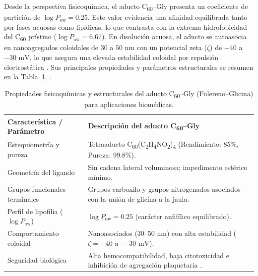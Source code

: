 Desde la perspectiva fisicoquímica, el aducto C\textsubscript{60}--Gly presenta un coeficiente de partición de $\log P_{\text{ow}} = 0.25$. Este valor evidencia una afinidad equilibrada tanto por fases acuosas como lipídicas, lo que contrasta con la extrema hidrofobicidad del C\textsubscript{60} prístino ($\log P_{\text{ow}} = 6.67$). %
 En disolución acuosa, el aducto se autoasocia en nanoagregados coloidales de 30 a $50\text{ nm}$ con un potencial zeta ($\zeta$) de $-40$ a $-30\text{ mV}$, lo que asegura una elevada estabilidad coloidal por repulsión electrostática \cite{sharoyko2024modification}. Sus principales propiedades y parámetros estructurales se resumen en la Tabla~\ref{tab:aplicaciones_fulereno}. \cite{nakamura2012water,jiang2015synthesis,sharoyko2024modification}.

\begin{table}[H]
\centering
\caption{Propiedades fisicoquímicas y estructurales del aducto C\textsubscript{60}--Gly (Fulereno--Glicina) para aplicaciones biomédicas.}
\label{tab:aplicaciones_fulereno}
\begin{tabular}{l p{10cm}}
\toprule
\textbf{Característica / Parámetro} & \textbf{Descripción del aducto C\textsubscript{60}--Gly} \\
\midrule
Estequiometría y pureza & Tetraaducto C\textsubscript{60}(C\textsubscript{2}H\textsubscript{4}NO\textsubscript{2})\textsubscript{4} (Rendimiento: 85\%, Pureza: 99.8\%).\\
Geometría del ligando & Sin cadena lateral voluminosa; impedimento estérico mínimo. \\
Grupos funcionales terminales & Grupos carboxilo y grupos nitrogenados asociados con la unión de glicina a la jaula. \\
Perfil de lipofilia ($\log P_{\text{ow}}$) & $\log P_{\text{ow}} = 0.25$ (carácter anfifílico equilibrado). \\
Comportamiento coloidal & Nanoasociados ($30\text{--}50\text{ nm}$) con alta estabilidad ($\zeta = -40\text{ a }-30\text{ mV}$). \\
Seguridad biológica & Alta hemocompatibilidad, baja citotoxicidad e inhibición de agregación plaquetaria  \cite{sharoyko2024modification}. \\
\bottomrule
\end{tabular}
\end{table}

